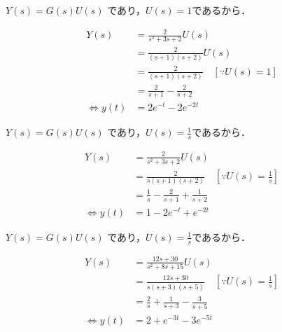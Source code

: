 \documentclass[a4paper,12pt]{article}
\begin{document}
\begin{tcolorbox}[title={[25] 伝達関数が
    \[G(s)=\frac{2}{s^2+3s+2}\]
    \qquad であるときのインパルス応答を求めよ． }]

    \qquad \(Y(s) =G(s)U(s)\) であり，\(U(s)=1\)であるから． 

    \begin{align*}
        Y(s)
        &= \frac{2}{s^2+3s+2}U(s) \\
        &= \frac{2}{(s+1)(s+2)}U(s) \\
        &= \frac{2}{(s+1)(s+2)}\quad [\because U(s)=1]\\
        &= \frac{2}{s+1} - \frac{2}{s+2} \\
        \Leftrightarrow y(t) &= 2e^{-t} - 2e^{-2t}
    \end{align*}

\end{tcolorbox}
\begin{tcolorbox}[title={[26] 伝達関数が
    \[G(s)=\frac{2}{s^2+3s+2}\]
    \qquad であるときのステップ応答を求めよ．}]

    \qquad \(Y(s) =G(s)U(s)\) であり，\(U(s)=\frac{1}{s}\)であるから． 

    \begin{align*}
        Y(s)
        &= \frac{2}{s^2+3s+2}U(s) \\
        &= \frac{2}{s(s+1)(s+2)} \quad [\because U(s)=\frac{1}{s}]\\
        &= \frac{1}{s} - \frac{2}{s+1} + \frac{1}{s+2}\\
        \Leftrightarrow y(t) &=1 - 2e^{-t} + e^{-2t}
    \end{align*}

\end{tcolorbox}
\begin{tcolorbox}[title={[27] 伝達関数が
    \[G(s)=\frac{12s+30}{s^2+8s+15}\]
    \qquad であるときのステップ応答を求めよ． }]

    \qquad \(Y(s) =G(s)U(s)\) であり，\(U(s)=\frac{1}{s}\)であるから． 

    \begin{align*}
        Y(s)
        &= \frac{12s+30}{s^2+8s+15}U(s) \\
        &= \frac{12s+30}{s(s+3)(s+5)} \quad [\because U(s)=\frac{1}{s}]\\
        &= \frac{2}{s} + \frac{1}{s+3} - \frac{3}{s+5}\\
        \Leftrightarrow y(t) &=2 + e^{-3t} - 3e^{-5t}
    \end{align*}

\end{tcolorbox}
\end{document}
